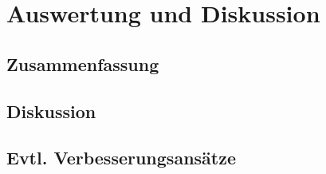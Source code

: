 \chapter{Auswertung und Diskussion}

\section{Zusammenfassung}

\section{Diskussion}

\section{Evtl. Verbesserungsansätze}